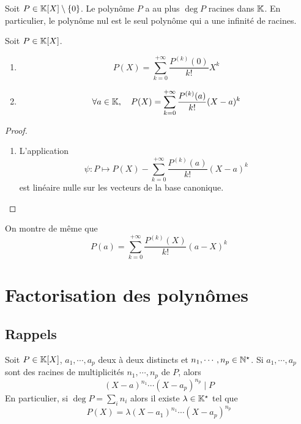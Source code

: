 \begin{thm}
    Soit $P\in \mathbb K[X]\setminus \{0\}$. Le polynôme $P$ a au plus $\deg P$ racines dans $\mathbb K$.
    En particulier, le polynôme nul est le seul polynôme qui a une infinité de racines.
\end{thm}

\begin{thm}
    Soit $P\in\mathbb K[X]$.
    \begin{enumerate}
        \item \[
                P(X)=\sum_{k=0}^{+\infty} \frac{P^{(k)}(0)}{k!}X^k
            \]
        \item \[
                \forall a\in\mathbb K, \quad P(X)=\sum_{k=0}^{+\infty}\frac{P^{(k)}(a)}{k!}(X-a)^k
            \]
    \end{enumerate}
\end{thm}
\begin{proof} ~
    \begin{enumerate}
        \item L'application \[
                \psi: P\longmapsto P(X)-\sum_{k=0}^{+\infty}\frac{P^{(k)}(a)}{k!}(X-a)^k
            \]
            est linéaire nulle sur les vecteurs de la base canonique.
    \end{enumerate}
\end{proof}

\begin{rem}
    On montre de même que \[
        P(a)=\sum_{k=0}^{+\infty}\frac{P^{(k)}(X)}{k!}(a-X)^k
    \]
\end{rem}

\section{Factorisation des polynômes}

\subsection{Rappels}

\begin{thm}
    Soit $P\in\mathbb K[X]$, $a_1, \cdots, a_p$ deux à deux distincts et $n_1, \cdots, n_p\in\mathbb N^\star$. Si $a_1, \cdots, a_p$ sont des racines de multiplicités $n_1, \cdots, n_p$ de $P$, alors \[
        (X-a)^{n_1}\cdots (X-a_p)^{n_p}\;|\;P
    \]
    En particulier, si $\deg P=\sum_i n_i$ alors il existe $\lambda\in\mathbb K^\star$ tel que \[
        P(X)=\lambda(X-a_1)^{n_1}\cdots (X-a_p)^{n_p}
    \]
\end{thm}

